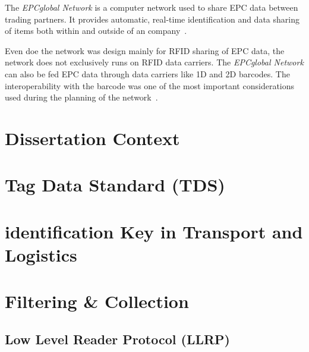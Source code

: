 The \emph{EPCglobal Network} is a computer network used to share \gls{EPC} data between trading partners. 
It provides automatic, real-time identification and data sharing of items both within and outside of an company~\cite[p. 213]{lahiriRFIDSourcebook2005}.

Even doe the network was design mainly for \gls{RFID} sharing of \gls{EPC} data, the network does not exclusively runs on \gls{RFID} data carriers. The \emph{EPCglobal Network} can also be fed \gls{EPC} data through data carriers like 1D and 2D barcodes. The interoperability with the barcode was one of the most important considerations used during the planning of the network~\cite{RFIDBarcodeInteroperability}.


\section{Dissertation Context}


\section{Tag Data Standard (TDS)}



\section{identification Key in Transport and Logistics}

\section{Filtering & Collection}

\subsection{Low Level Reader Protocol (LLRP)}

